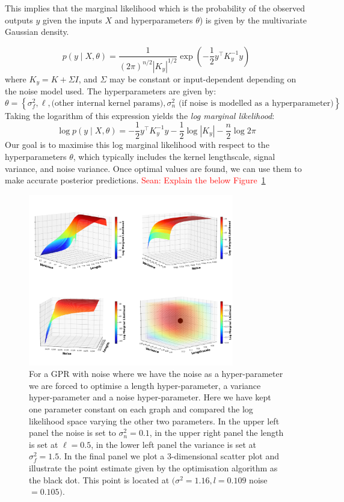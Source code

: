 \documentclass[12pt]{article}
\newcommand{\Sean}[1]{{\textcolor{red}{{Sean: #1}} }}
\begin{document}
\noindent
This implies that the marginal likelihood which is the probability of the observed outputs \( y \) given the inputs \( X \) and hyperparameters \( \theta \)) is given by the multivariate Gaussian density. 

\[
p(y \mid X, \theta) = \frac{1}{(2\pi)^{n/2} |K_y|^{1/2}} \exp\left( -\frac{1}{2} y^\top K_y^{-1} y \right)
\]
where \( K_y = K + \Sigma I \), and \( \Sigma \) may be constant or input-dependent depending on the noise model used.
\noindent
The hyperparameters are given by:
\[
\theta = \left\{ \sigma_f^2, \ell, \text{(other internal kernel params)}, \sigma_n^2 \,\, \text{(if noise is modelled as a hyperparameter)} \right\}.
\]
\noindent
Taking the logarithm of this expression yields the \textit{log marginal likelihood}:
\begin{equation}\label{eq: 5}
\log p(y \mid X, \theta) = -\frac{1}{2} y^\top K_y^{-1} y - \frac{1}{2} \log |K_y| - \frac{n}{2} \log 2\pi
\end{equation}
\noindent
Our goal is to maximise this log marginal likelihood with respect to the hyperparameters \( \theta \), which typically includes the kernel lengthscale, signal variance, and noise variance. Once optimal values are found, we can use them to make accurate posterior predictions.
\Sean{Explain the below Figure~\ref{figure: Optimising Hyper-params}}
\begin{figure}[H]
    \centering
    \includegraphics[width=0.8\textwidth]{LatexPlots/1dplots/LogLikeallparams.png}
    \caption{For a GPR with noise where we have the noise as a hyper-parameter we are forced to optimise a length hyper-parameter, a variance hyper-parameter and a noise hyper-parameter. 
    Here we have kept one parameter constant on each graph and compared the log likelihood space varying the other two parameters. 
    In the upper left panel the noise is set to $\sigma^2_n= 0.1$, in the upper right panel the length is set at $ \ell=0.5$, in the lower left panel the variance is set at $\sigma^2_f=1.5$. 
    In the final panel we plot a 3-dimensional scatter plot and illustrate the point estimate given by the optimisation algorithm as the black dot. This point is located at
    $(\sigma^2 = 1.16, l = 0.109$ noise$ = 0.105)$.}
   \label{figure: Optimising Hyper-params}
\end{figure} 
\end{document}
